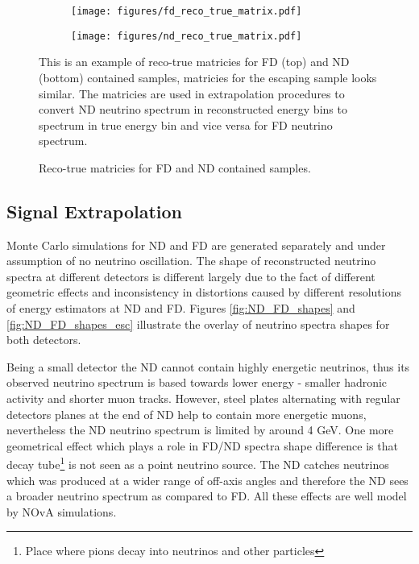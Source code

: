 \begin{figure}[th]
\centering
\begin{subfigure}[t]{0.95\textwidth}
  \centering
  \texttt{[image: figures/fd\_reco\_true\_matrix.pdf]}
\end{subfigure}
\vspace{0.5cm}
\newline
\begin{subfigure}[t]{0.95\textwidth}
  \centering
  \texttt{[image: figures/nd\_reco\_true\_matrix.pdf]}
\end{subfigure}
\caption{ Reco-true matricies for FD and ND contained samples. }
{ This is an example of reco-true matricies for FD (top) and ND (bottom) contained samples, matricies for the
escaping sample looks similar. The matricies are used in extrapolation procedures to convert ND neutrino spectrum
in reconstructed energy bins to spectrum in true energy bin and vice versa for FD neutrino spectrum. }
\label{fig:reco_true_matricies}
\end{figure}
\clearpage

\subsection{Signal Extrapolation} \label{extrap_procedure}
Monte Carlo simulations for ND and FD are generated separately and under assumption of no neutrino
oscillation. The shape of reconstructed neutrino spectra at different detectors is different largely due
to the fact of different geometric effects and inconsistency in distortions caused by different
resolutions of energy estimators at ND and FD. Figures \ref{fig:ND_FD_shapes} and \ref{fig:ND_FD_shapes_esc}
illustrate the overlay of neutrino spectra shapes for both detectors.

Being a small detector the ND cannot contain highly energetic neutrinos, thus its observed neutrino
spectrum is based towards lower energy - smaller hadronic activity and shorter muon tracks. However,
steel plates alternating with regular detectors planes at the end of ND help to contain more
energetic muons, nevertheless the ND neutrino spectrum is limited by around 4 GeV. One more geometrical effect
which plays a role in FD/ND spectra shape difference is that decay tube\footnote{Place where pions
decay into neutrinos and other particles} is not seen as a point neutrino source. The ND catches neutrinos
which was produced at a wider range of off-axis angles and therefore the ND sees a broader neutrino spectrum 
as compared to FD. All these effects are well model by NOvA simulations.

